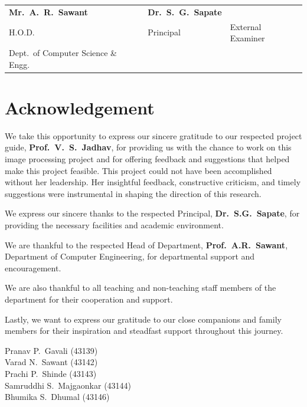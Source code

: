 \documentclass[12pt,a4paper]{report}
\begin{document}
\vspace{1.5cm}
\begin{tabular}{p{5cm}p{4cm}p{4cm}}
  \textbf{Mr.\ A.\ R.\ Sawant}        & \textbf{Dr.\ S.\ G.\ Sapate} & \\
  H.O.D.                              & Principal                     & External Examiner \\
  Dept.\ of Computer Science \& Engg. & & \\
\end{tabular}

\chapter*{Acknowledgement}

We take this opportunity to express our sincere gratitude to our respected project guide,
\textbf{Prof.\ V.\ S.\ Jadhav}, for providing us with the chance to work on this image processing
project and for offering feedback and suggestions that helped make this project feasible. This
project could not have been accomplished without her leadership. Her insightful feedback,
constructive criticism, and timely suggestions were instrumental in shaping the direction of
this research.

We express our sincere thanks to the respected Principal, \textbf{Dr.\ S.G.\ Sapate}, for
providing the necessary facilities and academic environment.

We are thankful to the respected Head of Department, \textbf{Prof.\ A.R.\ Sawant}, Department
of Computer Engineering, for departmental support and encouragement.

We are also thankful to all teaching and non-teaching staff members of the department for their
cooperation and support.

Lastly, we want to express our gratitude to our close companions and family members for their
inspiration and steadfast support throughout this journey.

\vspace{1cm}
\begin{flushright}
  Pranav P.\ Gavali (43139)\\
  Varad N.\ Sawant (43142)\\
  Prachi P.\ Shinde (43143)\\
  Samruddhi S.\ Majgaonkar (43144)\\
  Bhumika S.\ Dhumal (43146)
\end{flushright}
\end{document}
